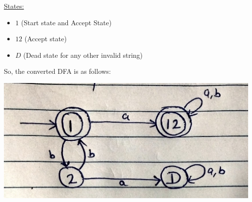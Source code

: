 \documentclass[letterpaper,12pt]{article}
\begin{document}
\underline{States:}
    \begin{itemize}
        \item $1$ (Start state and Accept State)
        \item $12$ (Accept state)
        \item $D$ (Dead state for any other invalid string)
    \end{itemize}

So, the converted DFA is as follows:

\includegraphics[scale = 0.20]{4}
\end{document}
